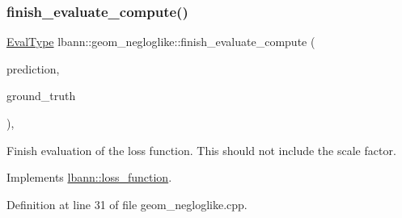 \subsubsection{\texorpdfstring{finish\+\_\+evaluate\+\_\+compute()}{finish\_evaluate\_compute()}}
{\footnotesize\ttfamily \hyperlink{base_8hpp_a3266f5ac18504bbadea983c109566867}{Eval\+Type} lbann\+::geom\+\_\+negloglike\+::finish\+\_\+evaluate\+\_\+compute (\begin{DoxyParamCaption}\item[{const \hyperlink{base_8hpp_a9a697a504ae84010e7439ffec862b470}{Abs\+Dist\+Mat} \&}]{prediction,  }\item[{const \hyperlink{base_8hpp_a9a697a504ae84010e7439ffec862b470}{Abs\+Dist\+Mat} \&}]{ground\+\_\+truth }\end{DoxyParamCaption})\hspace{0.3cm}{\ttfamily [override]}, {\ttfamily [virtual]}}

Finish evaluation of the loss function. This should not include the scale factor. 

Implements \hyperlink{classlbann_1_1loss__function_a3ea8553a4e9c75477d7d4fc533c4d4fd}{lbann\+::loss\+\_\+function}.



Definition at line 31 of file geom\+\_\+negloglike.\+cpp.


